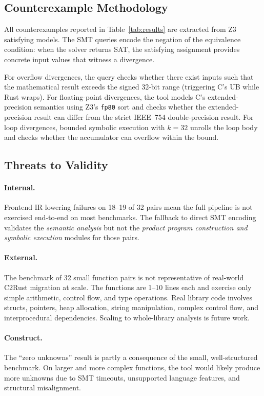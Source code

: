 \documentclass[11pt]{article}
\begin{document}
\subsection{Counterexample Methodology}
\label{sec:eval-counterexamples}

All counterexamples reported in Table~\ref{tab:results} are extracted from Z3 satisfying models. The SMT queries encode the negation of the equivalence condition: when the solver returns SAT, the satisfying assignment provides concrete input values that witness a divergence.

For overflow divergences, the query checks whether there exist inputs such that the mathematical result exceeds the signed 32-bit range (triggering C's UB while Rust wraps). For floating-point divergences, the tool models C's extended-precision semantics using Z3's \texttt{fp80} sort and checks whether the extended-precision result can differ from the strict IEEE~754 double-precision result. For loop divergences, bounded symbolic execution with $k = 32$ unrolls the loop body and checks whether the accumulator can overflow within the bound.


\subsection{Threats to Validity}
\label{sec:eval-threats}

\paragraph{Internal.}
Frontend IR lowering failures on 18--19 of 32 pairs mean the full pipeline is not exercised end-to-end on most benchmarks. The fallback to direct SMT encoding validates the \emph{semantic analysis} but not the \emph{product program construction and symbolic execution} modules for those pairs.

\paragraph{External.}
The benchmark of 32 small function pairs is not representative of real-world C2Rust migration at scale. The functions are 1--10 lines each and exercise only simple arithmetic, control flow, and type operations. Real library code involves structs, pointers, heap allocation, string manipulation, complex control flow, and interprocedural dependencies. Scaling to whole-library analysis is future work.

\paragraph{Construct.}
The ``zero unknowns'' result is partly a consequence of the small, well-structured benchmark. On larger and more complex functions, the tool would likely produce more unknowns due to SMT timeouts, unsupported language features, and structural misalignment.
\end{document}
